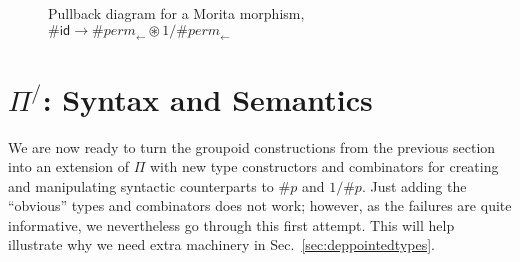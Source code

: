 \documentclass[a4paper,USenglish]{lipics-v2016-utf8x}
\newcommand{\hash}{\#}
\newcommand{\order}[1]{\hash #1}
\newcommand{\iorder}[1]{1/\hash #1}
\newcommand{\ot}{\mathbb{1}}
\newcommand{\permfive}{\mathit{perm}_{\leftarrow}}
\newcommand{\idiso}{\mathsf{{id}}}
\begin{document}
\begin{figure}[h]
  \centering
  \caption{
    \label{fig:morita}
    Pullback diagram for a Morita morphism,
    $\order{\idiso} \rightarrow \order{\permfive} \circledast
    \iorder{\permfive}$
  }
\end{figure}

\section{$\Pi^/$: Syntax and Semantics}

We are now ready to turn the groupoid constructions from the previous section
into an extension of $\Pi$ with new type constructors and combinators for
creating and manipulating syntactic counterparts to $\order{p}$ and
$\iorder{p}$.  Just adding the ``obvious'' types and combinators does
not work; however, as the failures are quite informative, we nevertheless go
through this first attempt.  This will help illustrate why we need extra
machinery in Sec.~\ref{sec:deppointedtypes}.
\end{document}
